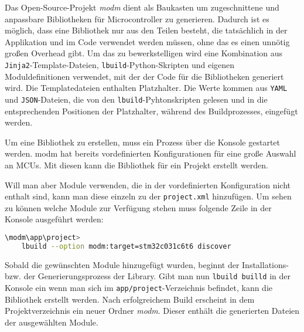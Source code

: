 
Das Open-Source-Projekt \emph{modm} \cite{github_modm}\cite{modm_io}   dient als Baukasten um zugeschnittene und anpassbare Bibliotheken für Microcontroller zu generieren.
Dadurch ist es möglich, dass eine Bibliothek nur aus den Teilen besteht, die tatsächlich in der Applikation und im Code verwendet werden müssen, ohne das es einen unnötig großen Overhead gibt.
Um das zu bewerkstelligen wird eine Kombination aus \texttt{Jinja2}-Template-Dateien, \texttt{lbuild}-Python-Skripten und eigenen Moduldefinitionen verwendet, mit der der Code für die Bibliotheken generiert wird.
Die Templatedateien enthalten Platzhalter.
Die Werte kommen aus \texttt{YAML} und \texttt{JSON}-Dateien, die von den \texttt{lbuild}-Pyhtonskripten gelesen und in die entsprechenden Positionen der Platzhalter, während des Buildprozesses, eingefügt werden.
 
Um eine Bibliothek zu erstellen, muss ein Prozess über die Konsole gestartet werden.
modm hat bereits vordefinierten Konfigurationen für eine große Auswahl an MCUs.
Mit diesen kann die Bibliothek für ein Projekt erstellt werden.

Will man aber Module verwenden, die in der vordefinierten Konfiguration nicht enthalt sind, kann man diese einzeln zu der \texttt{project.xml} hinzufügen.
Um sehen zu können welche Module zur Verfügung stehen muss folgende Zeile in der Konsole ausgeführt werden:

\vspace{3mm}
\begin{lstlisting}[language=bash, caption={Konsolenbefehl um verf\"ugbare Module aufgelistet zu bekommen; hier f\"ur den STM32C031C6T6 Microcontroller.}, label={lst:modm_lbild_discover}]
\modm\app\project>
	lbuild --option modm:target=stm32c031c6t6 discover
\end{lstlisting}

Sobald die gewünschten Module hinzugefügt wurden, beginnt der Installations- bzw. der Generierungsprozess der Library. 
Gibt man nun \texttt{lbuild builld} in der Konsole ein wenn man sich im \texttt{app/project}-Verzeichnis befindet, kann die Bibliothek erstellt werden.
Nach erfolgreichem Build erscheint in dem Projektverzeichnis ein neuer Ordner \emph{modm}.
Dieser enthält die generierten Dateien der ausgewählten Module.

%

